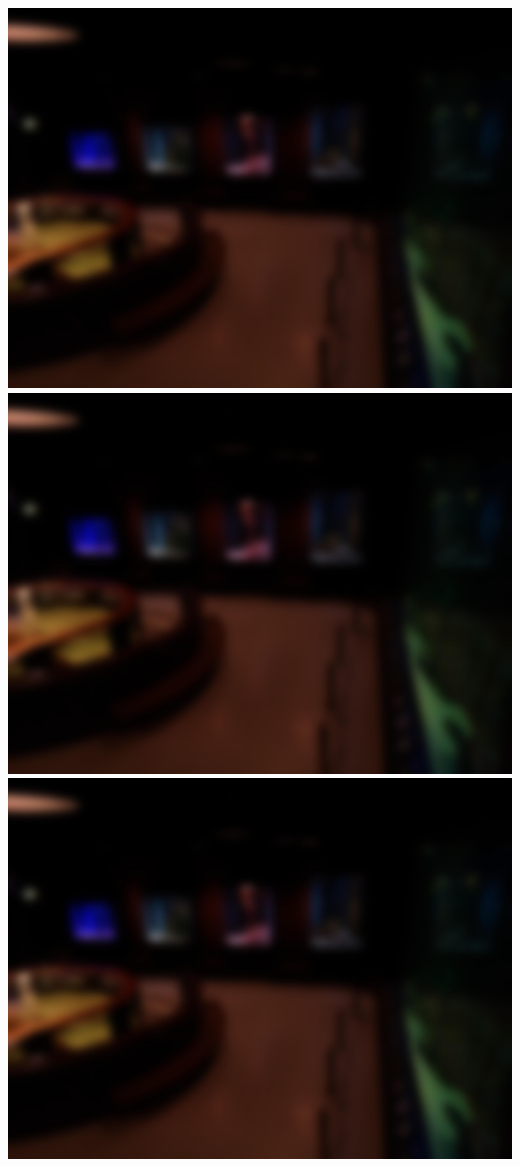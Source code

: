 \appendix
\label{app:images}
\includegraphics[width=\textwidth]{Images/DeviceImages/1st-iteration/cal1.jpg}
\includegraphics[width=\textwidth]{Images/DeviceImages/1st-iteration/cal1.jpg}
\includegraphics[width=\textwidth]{Images/DeviceImages/1st-iteration/cal1.jpg}
